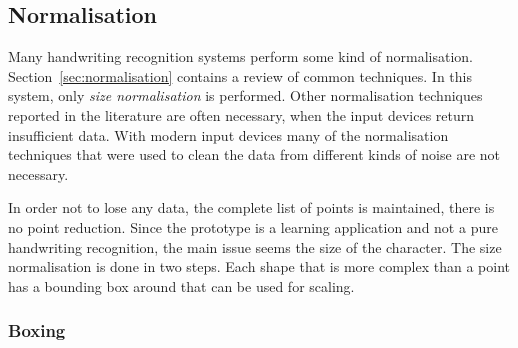 \subsection{Normalisation}
\label{sec:hwre:normalisation}

Many handwriting recognition systems perform some kind of normalisation.
Section~\ref{sec:normalisation} contains a review of common techniques.
In this system, only \emph{size normalisation} is performed. Other normalisation 
techniques reported in the literature are often necessary, when the input 
devices return insufficient data. With modern input devices many of the 
normalisation techniques that were used to clean the data from different
kinds of noise are not necessary.

In order not to lose any data, the complete list of points is maintained,
there is no point reduction. Since the prototype is a learning application and 
not a pure handwriting recognition, the main issue seems the size of the 
character. The size normalisation is done in two steps. Each shape that
is more complex than a point has a bounding box around that can be used for 
scaling.

\subsubsection{Boxing}
\label{sec:hwre:boxing}

